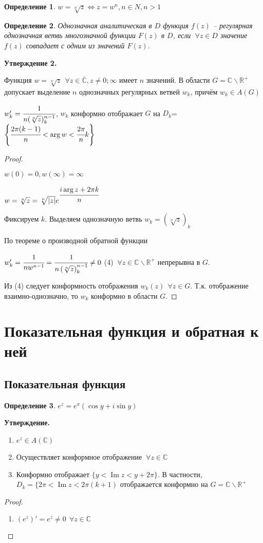 \documentclass[draft]{report}
\newcommand{\forcenewline}{$\phantom{\mbox{newline}}$\newline}
\newcommand{\R}{\mathbb{R}}
\renewcommand{\C}{\mathbb{C}}
\newcommand{\LRA}{\Leftrightarrow}
\renewcommand{\bar}{\overline}
\renewcommand{\Im}{\mathop{\mathrm{Im}}\nolimits}
\newcommand{\F}{\ \forall}
\newcommand{\CC}{\bar{\C}}
\newcommand{\opr}[1]{\begin{opred}#1\end{opred}}
\newtheorem*{opred}{Определение}
\theoremstyle{remark}
\begin{document}
\opr{$w=\sqrt[n]{z}\LRA z=w^n,n\in N, n>1$}
\opr{Однозначная аналитическая в $D$ функция $f(z)$ -- регулярная однозначная ветвь многозначной функции $F(z)$ в $D$, если $\F z\in D$ значение $f(z)$ совпадает с одним из значений $F(z)$.}
{\bfseries Утверждение 2.}

Функция $w=\sqrt[n]{z}\ \F z\in\CC,z\neq 0;\infty$ имеет $n$ значений. В области $G=\C\smallsetminus\R^+$ допускает выделение $n$ однозначных регулярных ветвей $w_k$, причём $w_k\in A(G)$

$w_k'=\cfrac{1}{n(\sqrt[n]{z})^{n-1}_k}$, $w_k$ конформно отображает $G$ на $D_k$=$\left\{\cfrac{2\pi(k-1)}{n}<\arg w<\cfrac{2\pi}{n}k\right\}$

\begin{proof}
\forcenewline

$w(0)=0, w(\infty)=\infty$

$w=\sqrt[n]{z}=\sqrt[n]{|z|}e^{\cfrac{i\arg z+2\pi k}{n}}$

Фиксируем $k$. Выделяем однозначную ветвь $w_k=\left(\sqrt[n]{z}\right)_k$

По теореме о производной обратной функции

$w_k'=\cfrac{1}{nw^{n-1}}=\cfrac{1}{n\left(\sqrt[n]{z}\right)^{n-1}_k}\neq 0$ (4) $\F z\in\C\smallsetminus\R^+$ непрерывна в $G$.

Из (4) следует конформность отображения $w_k(z)\ \F z\in G$. Т.к. отображение взаимно-однозначно, то $w_k$ конформно в области $G$.
\end{proof}

\section{Показательная функция и обратная к ней}

\subsection{Показательная функция}

\opr{$e^z=e^x(\cos y+i\sin y)$}
{\bfseries Утверждение.}
\begin{enumerate}
\item $e^z\in A(\C)$
\item Осуществляет конформное отображение $\F z\in\C$
\item Конформно отображает $\{y<\Im z<y+2\pi\}$. В частности, $D_k=\{2\pi <\Im z<2\pi(k+1)$ отображается конформно на $G=\C\smallsetminus\R^+$
\end{enumerate}
\begin{proof}
\forcenewline
\begin{enumerate}
\item $(e^z)'=e^z\neq0\ \F z\in\C$
\end{enumerate}
\end{proof}
\end{document}
